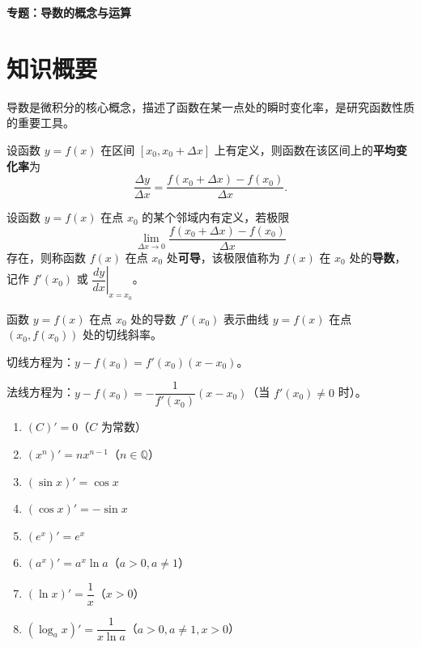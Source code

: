\documentclass[11pt]{ctexrep}
\begin{document}
\begin{center}
    {\LARGE\bfseries 专题：导数的概念与运算}
\end{center}

\section*{知识概要}

导数是微积分的核心概念，描述了函数在某一点处的瞬时变化率，是研究函数性质的重要工具。

\begin{definition}[平均变化率]
    设函数 $y = f(x)$ 在区间 $[x_0, x_0 + \Delta x]$ 上有定义，则函数在该区间上的\textbf{平均变化率}为
    \[
        \frac{\Delta y}{\Delta x} = \frac{f(x_0 + \Delta x) - f(x_0)}{\Delta x}.
    \]
\end{definition}

\begin{definition}[导数的定义]
    设函数 $y = f(x)$ 在点 $x_0$ 的某个邻域内有定义，若极限
    \[
        \lim_{\Delta x \to 0} \frac{f(x_0 + \Delta x) - f(x_0)}{\Delta x}
    \]
    存在，则称函数 $f(x)$ 在点 $x_0$ 处\textbf{可导}，该极限值称为 $f(x)$ 在 $x_0$ 处的\textbf{导数}，记作 $f'(x_0)$ 或 $\left.\dfrac{dy}{dx}\right|_{x=x_0}$。
\end{definition}

\begin{property}[导数的几何意义]
    函数 $y = f(x)$ 在点 $x_0$ 处的导数 $f'(x_0)$ 表示曲线 $y = f(x)$ 在点 $(x_0, f(x_0))$ 处的切线斜率。
    
    切线方程为：$y - f(x_0) = f'(x_0)(x - x_0)$。
    
    法线方程为：$y - f(x_0) = -\dfrac{1}{f'(x_0)}(x - x_0)$（当 $f'(x_0) \neq 0$ 时）。
\end{property}

\begin{property}[基本求导公式]
    \begin{enumerate}
        \item $(C)' = 0$（$C$ 为常数）
        \item $(x^n)' = nx^{n-1}$（$n \in \mathbb{Q}$）
        \item $(\sin x)' = \cos x$
        \item $(\cos x)' = -\sin x$
        \item $(e^x)' = e^x$
        \item $(a^x)' = a^x \ln a$（$a > 0, a \neq 1$）
        \item $(\ln x)' = \dfrac{1}{x}$（$x > 0$）
        \item $(\log_a x)' = \dfrac{1}{x \ln a}$（$a > 0, a \neq 1, x > 0$）
    \end{enumerate}
\end{property}
\end{document}

